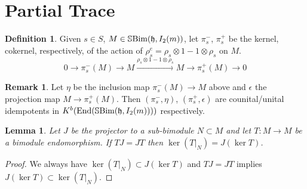 \documentclass[10pt]{article}
\numberwithin{theorem}{section}
\newtheorem{lemma}[theorem]{Lemma}
\theoremstyle{definition}
\newtheorem{definition}[theorem]{Definition}
\newtheorem*{remark}{Remark}
\newcommand{\hf}{\mathfrak{h}}
\newcommand{\sbim}{\mathbb{S}\textnormal{Bim}}
\newcommand{\0}{\ \raisebox{-2ex}{\begin{tikzpicture}[xscale=0.25,yscale=0.3,thick,baseline]
 \draw (0,0) -- (0,3); 
\end{tikzpicture}}}
\renewcommand{\1}{\ \raisebox{-2ex}{\begin{tikzpicture}[xscale=0.25,yscale=0.3,thick,baseline]
 \draw (0,0) -- (0,1);
 \draw (0,2) -- (0,3);
 \node[dot] at (0,1) {};
  \node[dot] at (0,2) {};
\end{tikzpicture}}}
\begin{document}
\section{Partial Trace}
\label{sect3}

\begin{definition}
\label{pidef}
    Given $s\in S$, $M\in \sbim(\hf  ,I_2(m))$, let $\pi^-_s$, $\pi^+_s$ be the kernel, cokernel, respectively, of the action of $\rho_s^e=\rho_s\otimes 1- 1\otimes \rho_s$ on $M$. 
    \[ 0\to \pi^-_s(M)\to M\xrightarrow{\rho_s\otimes 1- 1\otimes \rho_s}M \to  \pi^+_s(M)\to 0 \]
\end{definition}


\begin{remark}
    Let $\eta$ be the inclusion map $ \pi^-_s(M)\to M$ above and $\epsilon$ the projection map $M \to  \pi^+_s(M)$. Then $(\pi^-_s, \eta)$, $(\pi^+_s, \epsilon)$  are counital/unital idempotents in $K^b(\mathrm{End}(\sbim(\hf  ,I_2(m))  ))$ respectively. 
\end{remark}



\begin{lemma}
\label{lem:jker}
    Let $J$ be the projector to a sub-bimodule $N\subset M$ and let $T: M\to M$ be a bimodule endomorphism. If $TJ=JT$ then $\ker(T|_N)=J(\ker T)$. 
\end{lemma}
\begin{proof}
  We always have $\ker(T|_N)\subset J(\ker T)$ and $TJ=JT$ implies $J(\ker T)\subset \ker(T|_N)$. 
\end{proof}
\end{document}

